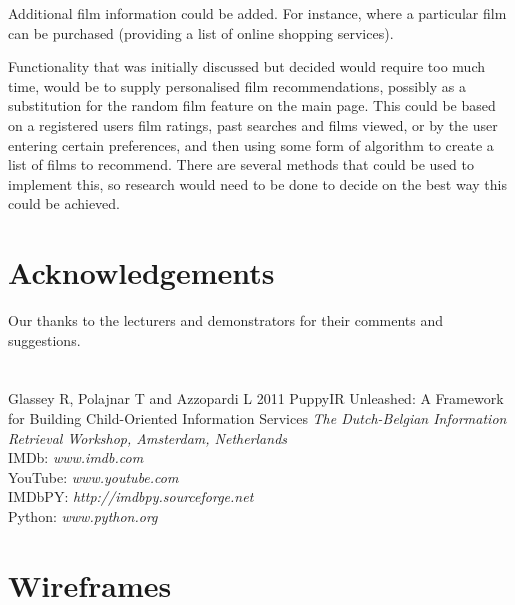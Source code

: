 \documentclass{sig-alt-release2}
\begin{document}
Additional film information could be added. For instance, where a particular film can be purchased (providing a list of online shopping services). 
 
Functionality that was initially discussed but decided would require too much time, would be to supply personalised film recommendations, possibly as a substitution for the random film feature on the main page. This could be based on a registered users film ratings, past searches and films viewed, or by the user entering certain preferences, and then using some form of algorithm to create a list of films to recommend. There are several methods that could be used to implement this, so research would need to be done to decide on the best way this could be achieved.

\section{Acknowledgements}
Our thanks to the lecturers and demonstrators for their comments and suggestions.

\section*{}
\begin{thebibliography}{9}
 Glassey R, Polajnar T and Azzopardi L 2011 PuppyIR Unleashed: A Framework for Building Child-Oriented Information Services {\it The Dutch-Belgian Information Retrieval Workshop, Amsterdam, Netherlands}\\
 IMDb: {\it www.imdb.com}\\
 YouTube: {\it www.youtube.com}\\
 IMDbPY: {\it http://imdbpy.sourceforge.net}\\
 Python: {\it www.python.org}\\
\end{thebibliography}

%
%

\newpage
\appendix
\section{Wireframes}
\end{document}
